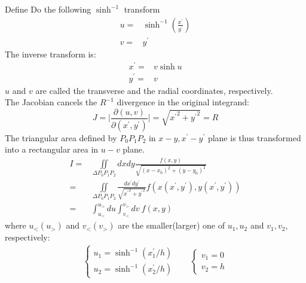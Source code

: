 \documentclass [10pt,letterpaper]{article}
\begin{document}
Define
Do the following $\sinh^{-1}$ transform
\begin{equation}  \label{eq:def-singular-near-singular-transform-u-v-xp-yp}
	\begin{split}
	       u
	       =&
		       \sinh^{-1}
		       \left(
				\frac
				{x^{\prime}}
				{y^{\prime}}
		       \right)
	       \\
	       v
	       =&
	       		y^{\prime}
	\end{split}
\end{equation}
The inverse transform is:
\begin{equation}  \label{eq:def-singular-near-singular-transform-xp-yp-u-v}
	\begin{split}
		x^{\prime}
		=& 
			v
			\sinh{u}
		\\
		y^{\prime}
		=&
			v
	\end{split}
\end{equation}
$u$ and $v$ are called the transverse and the radial coordinates, respectively.
\\
The Jacobian cancels the $R^{-1}$ divergence in the original integrand:
\begin{equation} \label{eq:result-singular-near-singular-jacobian-u-v-xp-yp}
	J
	=
	\bigg\lvert
		\frac
		{\partial(u,v)}
		{\partial(x^{\prime},y^{\prime})} 
	\bigg\rvert 
	=
	\sqrt{
		{x^{\prime}}^2
		+
		{y^{\prime}}^2
	}
	=
	R
\end{equation}
The triangular area defined by $P_0 P_1 P_2$ in $x-y,x^{\prime}-y^{\prime}$ plane is thus transformed into a rectangular area in $u-v$ plane.
\begin{equation} \label{eq:singular-near-singular-integral-result}
	\begin{split} 
		I
		=&
			\iint 
			\limits_{\Delta P_0 P_1 P_2}
			dx dy
			\frac{ f(x,y) }
			{ \sqrt{(x-x_0)^2+(y-y_0)^2} }
		\\
		=& 
			\iint 
			\limits_{\Delta P_0 P_1 P_2}
			\frac
			{  dx^{\prime} dy^{\prime}  }
			{ \sqrt{{x^{\prime}}^2+{y^{\prime}}^2} }
			f(x(x^{\prime},y^{\prime}),y(x^{\prime},y^{\prime}))
		\\
		=&
			\int 
			\nolimits_{u_<}^{u_>}
			du
			\int 
			\nolimits_{v_<}^{v_>}
			dv
			\ f(x,y)
	\end{split}
\end{equation}
where $u_<(u_>)$ and $v_<(v_>)$ are the smaller(larger) 
one of $u_1,u_2$ and $v_1,v_2$, respectively:
\begin{equation} \label{eq:def-singular-near-singular-u1-u2-v1-v2}
	\begin{split}
		\begin{cases}
			u_1	=	\sinh^{-1}(x_1^{\prime}/h)		\\
			u_2	=	\sinh^{-1}(x_2^{\prime}/h)
		\end{cases}
		\ \ \ \ \ \ \ \ 
		\begin{cases} 
			v_1	=	0					\\
			v_2	=	h
		\end{cases}
	\end{split}
\end{equation}
\end{document}
